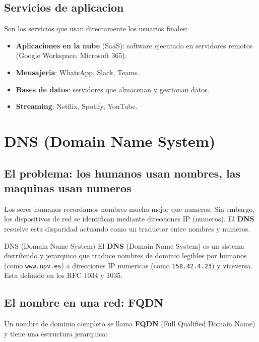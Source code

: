 \subsection{Servicios de aplicacion}

Son los servicios que usan directamente los usuarios finales:

\begin{itemize}
    \item \textbf{Aplicaciones en la nube} (SaaS): software ejecutado en servidores
    remotos (Google Workspace, Microsoft 365).
    \item \textbf{Mensajeria}: WhatsApp, Slack, Teams.
    \item \textbf{Bases de datos}: servidores que almacenan y gestionan datos.
    \item \textbf{Streaming}: Netflix, Spotify, YouTube.
\end{itemize}


\section{DNS (Domain Name System)}

\subsection{El problema: los humanos usan nombres, las maquinas usan numeros}

Los seres humanos recordamos nombres mucho mejor que numeros. Sin embargo,
los dispositivos de red se identifican mediante direcciones IP (numeros). El
\textbf{DNS} resuelve esta disparidad actuando como un traductor entre nombres y
numeros.

\begin{definicion}{DNS (Domain Name System)}
El \textbf{DNS} (Domain Name System) es un sistema distribuido y jerarquico que
traduce nombres de dominio legibles por humanos (como \texttt{www.upv.es}) a
direcciones IP numericas (como \texttt{158.42.4.23}) y viceversa. Esta definido en
los RFC 1034 y 1035.
\end{definicion}

\subsection{El nombre en una red: FQDN}

Un nombre de dominio completo se llama \textbf{FQDN} (Full Qualified Domain Name)
y tiene una estructura jerarquica:


